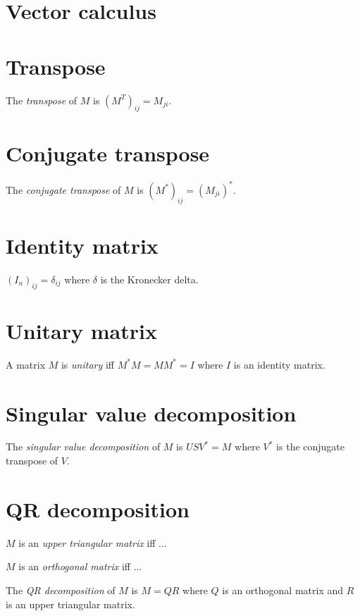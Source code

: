 \section{Vector calculus}

\section{Transpose}

The
%
%
%
\emph{transpose} of \(M\) is \((M^T)_{ij} = M_{ji}\).

\section{Conjugate transpose}

The
%
%
%
%
\emph{conjugate transpose} of \(M\) is \((M^*)_{ij} = (M_{ji})^*\).

\section{Identity matrix}

%
%
\((I_n)_{ij} = \delta_{ij}\) where \(\delta\) is the
%
Kronecker delta.

\section{Unitary matrix}

A matrix \(M\) is
\emph{unitary} iff \(M^*M = MM^* = I\)
where \(I\) is an identity matrix.

\section{Singular value decomposition}

The
%
%
\emph{singular value decomposition} of \(M\) is \(U S V^* = M\) where \(V^*\) is the conjugate transpose of \(V\).

\section{QR decomposition}

\(M\) is an
%
%
\emph{upper triangular matrix} iff ...

\(M\) is an
%
%
\emph{orthogonal matrix} iff ...

The
%
%
\emph{QR decomposition} of \(M\) is \(M = QR\) where
\(Q\) is an orthogonal matrix and
\(R\) is an upper triangular matrix.
